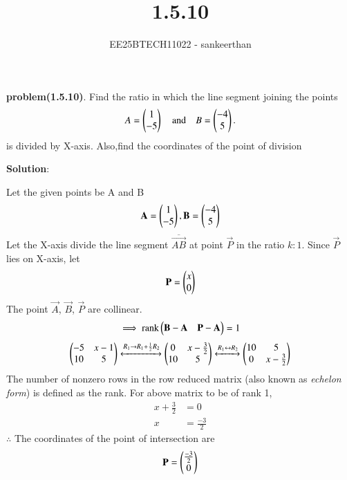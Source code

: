 \documentclass[journal]{IEEEtran}
\begin{document}



\title{1.5.10}
\author{EE25BTECH11022 - sankeerthan}
{\let\newpage\relax\maketitle}

\renewcommand{\thefigure}{\theenumi}
\renewcommand{\thetable}{\theenumi}
\setlength{\intextsep}{10pt} %


\renewcommand{\thetable}{\theenumi}


\textbf{problem(1.5.10)}.
Find the ratio in which the line segment joining the points 
\begin{align}
    A=\begin{pmatrix}1\\-5\end{pmatrix} \quad \text{and} \quad B=\begin{pmatrix}-4\\5\end{pmatrix}.
\end{align} is divided by X-axis. Also,find the coordinates of the  point of division

\textbf{Solution}:

Let the given points be A and B
\begin{align*} \mathbf{A} = \begin{pmatrix}1 \\ -5\end{pmatrix}, \mathbf{B} = \begin{pmatrix}-4 \\ 5\end{pmatrix} \end{align*}
Let the X-axis divide the line segment \(\overline{\vec{AB}}\) at point $\vec{P}$ in the ratio $k:1$.
Since $\vec{P}$ lies on X-axis, let
\begin{align*}
\mathbf{P} = \begin{pmatrix}x \\ 0\end{pmatrix}
\end{align*}
The point $\vec{A}$, $\vec{B}$, $\vec{P}$ are collinear.
\begin{align}
\implies \text{rank}\begin{pmatrix}\mathbf{B}-\mathbf{A} & \mathbf{P}-\mathbf{A}\end{pmatrix} = 1
\end{align}
\begin{align}
\begin{pmatrix}-5 & x-1 \\ 10 & 5\end{pmatrix} \xleftrightarrow{R_1 \rightarrow {R_1 + \frac{1}{2}R_2}}\begin{pmatrix}0 & x-\frac{3}{2} \\ 10 & 5\end{pmatrix} \xleftrightarrow{R_1 \leftrightarrow R_2}  \begin{pmatrix}10 & 5 \\ 0 & x-\frac{3}{2}\end{pmatrix}
\end{align}
The number of nonzero rows in the row reduced matrix (also known as {\em echelon form}) is defined as the rank. For above matrix to be of rank 1,
\begin{align}
x+\frac{3}{2} &= 0 \\
x &= \frac{-3}{2}
\end{align}
$\therefore$ The coordinates of the point of intersection are 
\begin{align*}
\mathbf{P} = \begin{pmatrix}\frac{-3}{2} \\ 0\end{pmatrix}
\end{align*}
\end{document}

